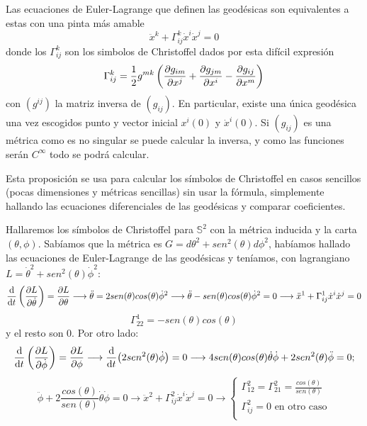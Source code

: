 \documentclass[palatino, bibnumbers]{apuntes}
\begin{document}
\begin{prop}
Las ecuaciones de Euler-Lagrange que definen las geodésicas son equivalentes a estas con una pinta más amable
\begin{equation}
\ddot{x}^k+\Gamma^k_{ij}\dot{x}^i\dot{x}^j=0
\end{equation}
donde los $\Gamma^k_{ij}$ son los simbolos de Christoffel dados por esta difícil expresión
\begin{equation}
\Gamma^k_{ij}=\frac{1}{2}g^{mk}\left(\pdv{g_{im}}{x^j}+\pdv{g_{jm}}{x^i}-\pdv{g_{ij}}{x^m}\right)
\end{equation}
con $(g^{ij})$ la matriz inversa de $(g_{ij})$. En particular, existe una única geodésica una vez escogidos punto y vector inicial $x^i(0)$ y $\dot{x}^i(0)$. Si $(g_{ij})$ es una métrica como es no singular se puede calcular la inversa, y como las funciones serán $C^\infty$ todo se podrá calcular.
\end{prop}
\begin{obs} Esta proposición se usa para calcular los símbolos de Christoffel en casos sencillos (pocas dimensiones y métricas sencillas) sin usar la fórmula, simplemente hallando las ecuaciones diferenciales de las geodésicas y comparar coeficientes.
\end{obs}
\begin{example} Hallaremos los símbolos de Christoffel para $\mathbb{S}^2$ con la métrica inducida y la carta $(\theta,\phi)$.
Sabíamos que la métrica es $G=d\theta^2+sen^2(\theta)d\phi^2$, habíamos hallado las ecuaciones de Euler-Lagrange de las geodésicas y teníamos, con lagrangiano $L=\dot{\theta}^2+sen^2(\theta)\dot{\phi}^2$: $$\dv{t}\left(\pdv{L}{\dot{\theta}}\right)=\pdv{L}{\theta}\longrightarrow\ddot{\theta}=2sen(\theta)cos(\theta)\dot{\phi}^2\longrightarrow\ddot{\theta}-sen(\theta)cos(\theta)\dot{\phi}^2=0\longrightarrow\ddot{x}^1+\Gamma^1_{ij}\dot{x}^i\dot{x}^j=0$$
$$\Gamma^1_{22}=-sen(\theta)cos(\theta)$$ y el resto son 0. Por otro lado:
$$\dv{t}\left(\pdv{L}{\dot{\phi}}\right)=\pdv{L}{\phi}\longrightarrow\dv{t}(2sen^2(\theta)\dot{\phi})=0\longrightarrow4sen(\theta)cos(\theta)\dot{\theta}\dot{\phi}+2sen^2(\theta)\ddot{\phi}=0;$$$$\ddot{\phi}+2\frac{cos(\theta)}{sen(\theta)}\dot{\theta}\dot{\phi}=0\longrightarrow\ddot{x}^2+\Gamma^2_{ij}\dot{x}^i\dot{x}^j=0\longrightarrow\begin{cases}
\Gamma^2_{12}=\Gamma^2_{21}=\frac{cos(\theta)}{sen(\theta)}\\
\Gamma^2_{ij}=0 \text{ en otro caso}\\
\end{cases}$$
\end{example}
\end{document}
